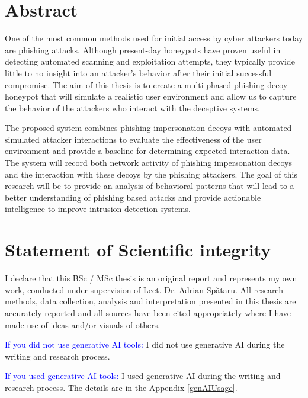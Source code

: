 \documentclass[12pt,a4paper]{book}
\theoremstyle{definition}
\theoremstyle{remark}
\begin{document}
\newpage
\normalsize{}

\section*{Abstract} 
One of the most common methods used for initial access by cyber attackers today are phishing attacks. Although present-day honeypots have proven useful in detecting automated scanning and exploitation attempts, they typically provide little to no insight into an attacker’s behavior after their initial successful compromise. The aim of this thesis is to create a multi-phased phishing decoy honeypot that will simulate a realistic user environment and allow us to capture the behavior of the attackers who interact with the deceptive systems.

The proposed system combines phishing impersonation decoys with automated simulated attacker interactions to evaluate the effectiveness of the user environment and provide a baseline for determining expected interaction data. The system will record both network activity of phishing impersonation decoys and the interaction with these decoys by the phishing attackers. The goal of this research will be to provide an analysis of behavioral patterns that will lead to a better understanding of phishing based attacks and provide actionable intelligence to improve intrusion detection systems.



\newpage

\section*{Statement of Scientific integrity} 

I declare that this BSc / MSc thesis is an original report and represents my own work, conducted under supervision of Lect. Dr. Adrian Spătaru. All research methods, data collection, analysis and interpretation presented in this thesis are accurately reported and all sources have been cited appropriately where I have made use of ideas and/or visuals of others.

\textcolor{blue}{If you did not use generative AI tools:} I did not use generative AI during the writing and research process.

\textcolor{blue}{If you used generative AI tools:} I used generative AI during the writing and research process. The details are in the Appendix \ref{genAIUsage}.
\end{document}
